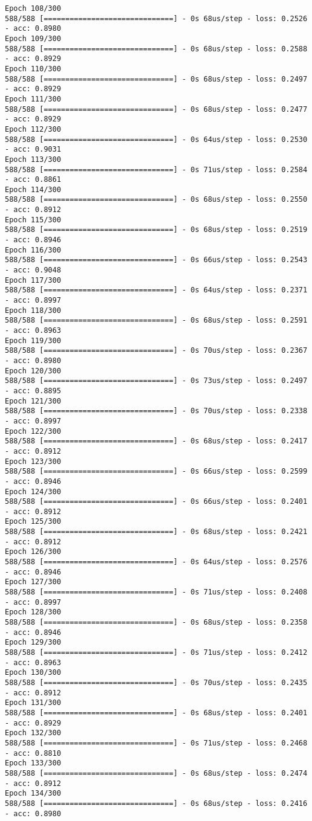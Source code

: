 \documentclass[11pt]{article}
\begin{document}
\begin{Verbatim}[commandchars=\\\{\}]
Epoch 108/300
588/588 [==============================] - 0s 68us/step - loss: 0.2526 - acc: 0.8980
Epoch 109/300
588/588 [==============================] - 0s 68us/step - loss: 0.2588 - acc: 0.8929
Epoch 110/300
588/588 [==============================] - 0s 68us/step - loss: 0.2497 - acc: 0.8929
Epoch 111/300
588/588 [==============================] - 0s 68us/step - loss: 0.2477 - acc: 0.8929
Epoch 112/300
588/588 [==============================] - 0s 64us/step - loss: 0.2530 - acc: 0.9031
Epoch 113/300
588/588 [==============================] - 0s 71us/step - loss: 0.2584 - acc: 0.8861
Epoch 114/300
588/588 [==============================] - 0s 68us/step - loss: 0.2550 - acc: 0.8912
Epoch 115/300
588/588 [==============================] - 0s 68us/step - loss: 0.2519 - acc: 0.8946
Epoch 116/300
588/588 [==============================] - 0s 66us/step - loss: 0.2543 - acc: 0.9048
Epoch 117/300
588/588 [==============================] - 0s 64us/step - loss: 0.2371 - acc: 0.8997
Epoch 118/300
588/588 [==============================] - 0s 68us/step - loss: 0.2591 - acc: 0.8963
Epoch 119/300
588/588 [==============================] - 0s 70us/step - loss: 0.2367 - acc: 0.8980
Epoch 120/300
588/588 [==============================] - 0s 73us/step - loss: 0.2497 - acc: 0.8895
Epoch 121/300
588/588 [==============================] - 0s 70us/step - loss: 0.2338 - acc: 0.8997
Epoch 122/300
588/588 [==============================] - 0s 68us/step - loss: 0.2417 - acc: 0.8912
Epoch 123/300
588/588 [==============================] - 0s 66us/step - loss: 0.2599 - acc: 0.8946
Epoch 124/300
588/588 [==============================] - 0s 66us/step - loss: 0.2401 - acc: 0.8912
Epoch 125/300
588/588 [==============================] - 0s 68us/step - loss: 0.2421 - acc: 0.8912
Epoch 126/300
588/588 [==============================] - 0s 64us/step - loss: 0.2576 - acc: 0.8946
Epoch 127/300
588/588 [==============================] - 0s 71us/step - loss: 0.2408 - acc: 0.8997
Epoch 128/300
588/588 [==============================] - 0s 68us/step - loss: 0.2358 - acc: 0.8946
Epoch 129/300
588/588 [==============================] - 0s 71us/step - loss: 0.2412 - acc: 0.8963
Epoch 130/300
588/588 [==============================] - 0s 70us/step - loss: 0.2435 - acc: 0.8912
Epoch 131/300
588/588 [==============================] - 0s 68us/step - loss: 0.2401 - acc: 0.8929
Epoch 132/300
588/588 [==============================] - 0s 71us/step - loss: 0.2468 - acc: 0.8810
Epoch 133/300
588/588 [==============================] - 0s 68us/step - loss: 0.2474 - acc: 0.8912
Epoch 134/300
588/588 [==============================] - 0s 68us/step - loss: 0.2416 - acc: 0.8980

\end{Verbatim}
\end{document}
